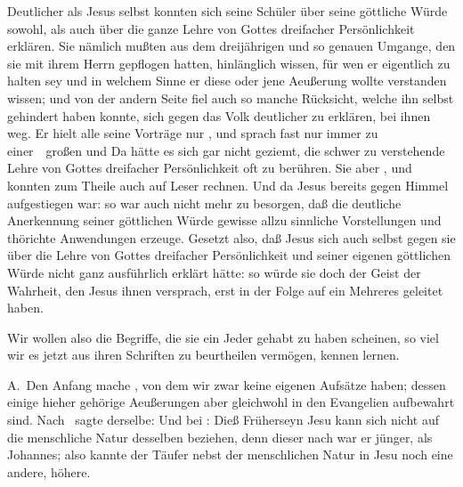 Deutlicher als Jesus selbst konnten sich seine Schüler über seine göttliche Würde sowohl, als auch über die ganze Lehre von Gottes dreifacher Persönlichkeit erklären. Sie nämlich mußten aus dem dreijährigen und so genauen Umgange, den sie mit ihrem Herrn gepflogen hatten, hinlänglich wissen, für wen er eigentlich zu halten sey und in welchem Sinne er diese oder jene Aeußerung wollte verstanden wissen; und von der andern Seite fiel auch so manche Rücksicht, welche ihn selbst gehindert haben konnte, sich gegen das Volk deutlicher zu erklären, bei ihnen weg. Er hielt alle seine Vorträge nur , und sprach fast nur immer zu einer~\ großen und  Da hätte es sich gar nicht geziemt, die schwer zu verstehende Lehre von Gottes dreifacher Persönlichkeit oft zu berühren. Sie aber , und konnten zum Theile auch auf  Leser rechnen. Und da Jesus bereits gegen Himmel aufgestiegen war: so war auch nicht mehr zu besorgen, daß die deutliche Anerkennung seiner göttlichen Würde gewisse allzu sinnliche Vorstellungen und thörichte Anwendungen erzeuge. Gesetzt also, daß Jesus sich auch selbst gegen sie über die Lehre von Gottes dreifacher Persönlichkeit und seiner eigenen göttlichen Würde nicht ganz ausführlich erklärt hätte: so würde sie doch der Geist der Wahrheit, den Jesus ihnen versprach, erst in der Folge auf ein Mehreres geleitet haben.\par
Wir wollen also die Begriffe, die sie ein Jeder gehabt zu haben scheinen, so viel wir es jetzt aus ihren Schriften zu beurtheilen vermögen, kennen lernen.\par
A.~Den Anfang mache , von dem wir zwar keine eigenen Aufsätze haben; dessen einige hieher gehörige Aeußerungen aber gleichwohl in den Evangelien aufbewahrt sind. Nach \ sagte derselbe:  Und bei :  Dieß Früherseyn Jesu kann sich nicht auf die menschliche Natur desselben beziehen, denn dieser nach war er jünger, als Johannes; also kannte der Täufer nebst der menschlichen Natur in Jesu noch eine andere, höhere.\par

